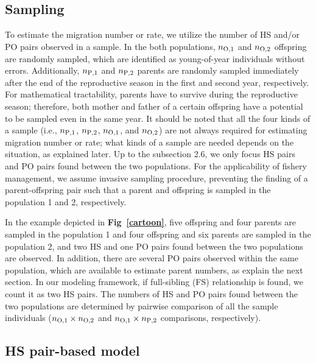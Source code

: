 \documentclass[12pt, English]{article}
\begin{document}
\begin{spacing}{1.9}
\begin{center}
\end{center}

\subsection{Sampling}

To estimate the migration number or rate, we utilize the number of HS and/or PO pairs observed in a sample. In the both populations, $n_{\rm O, 1}$ and $n_{\rm O, 2}$ offspring are randomly sampled, which are identified as young-of-year individuals without errors. Additionally, $n_{\rm P, 1}$ and $n_{\rm P, 2}$ parents are randomly sampled immediately after the end of the reproductive season in the first and second year, respectively. For mathematical tractability, parents have to survive during the reproductive season; therefore, both mother and father of a certain offspring have a potential to be sampled even in the same year. It should be noted that all the four kinds of a sample (i.e., $n_{\rm P, 1}$, $n_{\rm P, 2}$, $n_{\rm O, 1}$, and $n_{\rm O, 2}$) are not always required for estimating migration number or rate; what kinds of a sample are needed depends on the situation, as explained later. Up to the subsection 2.6, we only focus HS pairs and PO pairs found between the two populations. For the applicability of fishery management, we assume invasive sampling procedure, preventing the finding of a parent-offspring pair such that a parent and offspring is sampled in the population 1 and 2, respectively. 

In the example depicted in {\bf Fig~\ref{cartoon}}, five offspring and four parents are sampled in the population 1 and four offspring and six parents are sampled in the population 2, and two HS and one PO pairs found between the two populations are observed. In addition, there are several PO pairs observed within the same population, which are available to estimate parent numbers, as explain the next section. In our modeling framework, if full-sibling (FS) relationship is found, we count it as two HS pairs. The numbers of HS and PO pairs found between the two populations are determined by pairwise comparison of all the sample individuals ($n_{\rm O,1}\times n_{\rm O,2}$ and $n_{\rm O,1}\times n_{\rm P,2}$ comparisons, respectively). 

\subsection{HS pair-based model}


\end{spacing}
\end{document}
